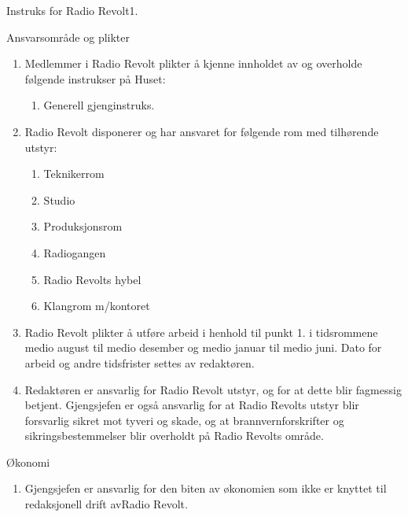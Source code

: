 \begin{instruks}{Instruks for Radio Revolt}{1. }{ }
    
    \begin{instruksledd}{Ansvarsområde og plikter}
        \begin{enumerate}   
            \item  Medlemmer i Radio Revolt plikter å kjenne innholdet av og overholde følgende
                instrukser på Huset:
                \begin{enumerate}
                    \item Generell gjenginstruks.
                \end{enumerate}
            \item Radio Revolt disponerer og har ansvaret for følgende rom med tilhørende utstyr:
                \begin{enumerate}
                    \item Teknikerrom
                    \item Studio
                    \item Produksjonsrom
                    \item Radiogangen
                    \item Radio Revolts hybel
                    \item Klangrom m/kontoret
                \end{enumerate}
            \item Radio Revolt plikter å utføre arbeid i henhold til punkt 1. i tidsrommene
                medio august til medio desember og medio januar til medio juni. Dato for arbeid og andre tidsfrister
                settes av redaktøren.
            \item Redaktøren er ansvarlig for Radio Revolt utstyr, og for at dette blir fagmessig
                betjent. Gjengsjefen er også ansvarlig for at Radio Revolts utstyr blir forsvarlig sikret mot tyveri
                og skade, og at brannvernforskrifter og sikringsbestemmelser blir overholdt på Radio Revolts område.
        \end{enumerate}
    \end{instruksledd}


    \begin{instruksledd}{Økonomi}
        \begin{enumerate}
            \item Gjengsjefen er ansvarlig for den biten av økonomien som ikke er knyttet til
                redaksjonell drift avRadio Revolt.
        \end{enumerate}
    \end{instruksledd}
    

\end{instruks}
